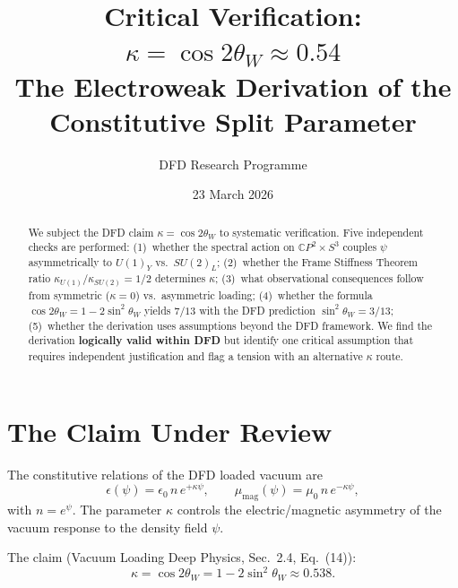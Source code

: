 \documentclass[aps,prd,twocolumn,superscriptaddress,nofootinbib]{revtex4-2}
\newcommand{\CP}{\mathbb{C}P}
\begin{document}
\title{Critical Verification: $\kappa = \cos 2\theta_W \approx 0.54$\\
The Electroweak Derivation of the Constitutive Split Parameter}

\author{DFD Research Programme}

\date{23 March 2026}

\begin{abstract}
We subject the DFD claim $\kappa = \cos 2\theta_W$ to systematic
verification.  Five independent checks are performed: (1)~whether the
spectral action on $\CP^2 \times S^3$ couples $\psi$ asymmetrically
to $U(1)_Y$ vs.\ $SU(2)_L$; (2)~whether the Frame Stiffness Theorem
ratio $\kappa_{U(1)}/\kappa_{SU(2)} = 1/2$ determines $\kappa$;
(3)~what observational consequences follow from symmetric ($\kappa = 0$)
vs.\ asymmetric loading; (4)~whether the formula
$\cos 2\theta_W = 1 - 2\sin^2\theta_W$ yields $7/13$ with the DFD
prediction $\sin^2\theta_W = 3/13$; (5)~whether the derivation uses
assumptions beyond the DFD framework.  We find the derivation
\textbf{logically valid within DFD} but identify one critical
assumption that requires independent justification and flag a
tension with an alternative $\kappa$ route.
\end{abstract}

\maketitle


\section{The Claim Under Review}
\label{sec:claim}

The constitutive relations of the DFD loaded vacuum are
\begin{equation}
\epsilon(\psi) = \epsilon_0\, n\, e^{+\kappa\psi}, \qquad
\mu_{\mathrm{mag}}(\psi) = \mu_0\, n\, e^{-\kappa\psi},
\end{equation}
with $n = e^\psi$.  The parameter $\kappa$ controls the
electric/magnetic asymmetry of the vacuum response to the density
field $\psi$.

The claim (Vacuum Loading Deep Physics, Sec.~2.4, Eq.~(14)):
\begin{equation}
\boxed{\kappa = \cos 2\theta_W = 1 - 2\sin^2\theta_W \approx 0.538.}
\label{eq:claim}
\end{equation}
\end{document}
